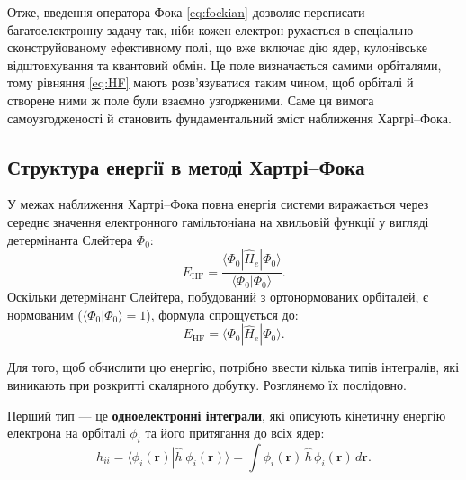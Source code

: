 Отже, введення оператора Фока \eqref{eq:fockian} дозволяє переписати багатоелектронну задачу так,
ніби кожен електрон рухається в спеціально сконструйованому ефективному полі,
що вже включає дію ядер, кулонівське відштовхування та квантовий обмін.
Це поле визначається самими орбіталями, тому рівняння \eqref{eq:HF} мають
розв’язуватися таким чином, щоб орбіталі й створене ними ж поле були
взаємно узгодженими. Саме ця вимога самоузгодженості й становить
фундаментальний зміст наближення Хартрі–Фока.


\subsection{Структура енергії в методі Хартрі–Фока}


У межах наближення Хартрі–Фока повна енергія системи виражається через середнє значення електронного гамільтоніана на хвильовій функції у вигляді детермінанта Слейтера $\Phi_0$:
\begin{equation*}
	E_{\mathrm{HF}} = \frac{\langle \Phi_0 | \hat{H}_e | \Phi_0 \rangle}{\langle \Phi_0 | \Phi_0 \rangle}.
\end{equation*}
Оскільки детермінант Слейтера, побудований з ортонормованих орбіталей, є нормованим ($\langle \Phi_0 | \Phi_0 \rangle = 1$), формула спрощується до:
\begin{equation*}
	E_{\mathrm{HF}} = \langle \Phi_0 | \hat{H}_e | \Phi_0 \rangle.
\end{equation*}

Для того, щоб обчислити цю енергію, потрібно ввести кілька типів інтегралів, які виникають при розкритті скалярного добутку. Розглянемо їх послідовно.

Перший тип --- це \textbf{одноелектронні інтеграли}, які описують кінетичну енергію електрона на орбіталі $\phi_i$ та його притягання до всіх ядер:
\[
	h_{ii} = \langle \phi_i(\mathbf r) | \hat{h} | \phi_i(\mathbf r) \rangle = \int \phi_i(\mathbf r)\, \hat h\, \phi_i(\mathbf r)\, d\mathbf r.
\]

